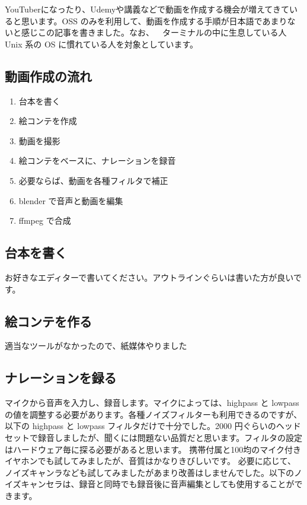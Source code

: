 \documentclass[mingoth,a4paper]{jsarticle}
\begin{document}

YouTuberになったり、Udemyや講義などで動画を作成する機会が増えてきていると思います。OSS のみを利用して、動画を作成する手順が日本語であまりないと感じこの記事を書きました。なお、~~ターミナルの中に生息している人~~ Unix 系の OS に慣れている人を対象としています。

\subsection{動画作成の流れ}

\begin{enumerate}
\item{台本を書く}
\item{絵コンテを作成}
\item{動画を撮影}
\item{絵コンテをベースに、ナレーションを録音}
\item{必要ならば、動画を各種フィルタで補正}
\item{blender で音声と動画を編集}
\item{ffmpeg で合成}
\end{enumerate}

\subsection{台本を書く}
お好きなエディターで書いてください。アウトラインぐらいは書いた方が良いです。

\subsection{絵コンテを作る}
適当なツールがなかったので、紙媒体やりました

\subsection{ナレーションを録る}
マイクから音声を入力し、録音します。マイクによっては、highpass と lowpass の値を調整する必要があります。各種ノイズフィルターも利用できるのですが、以下の highpass と lowpass フィルタだけで十分でした。2000 円ぐらいのヘッドセットで録音しましたが、聞くには問題ない品質だと思います。フィルタの設定はハードウェア毎に探る必要があると思います。
携帯付属と100均のマイク付きイヤホンでも試してみましたが、音質はかなりきびしいです。
必要に応じて、ノイズキャンラなども試してみましたがあまり改善はしませんでした。以下のノイズキャンセラは、録音と同時でも録音後に音声編集としても使用することができます。
\end{document}
